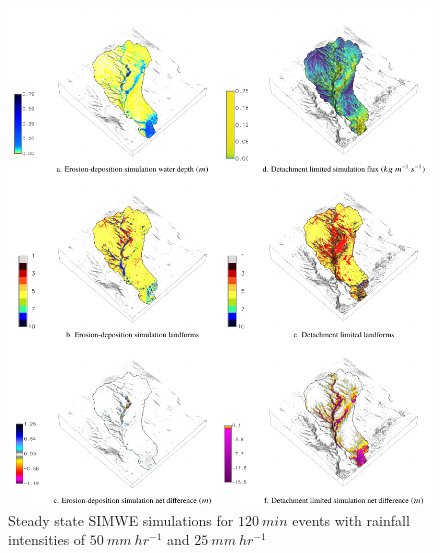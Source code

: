 \documentclass[esurf, manuscript]{copernicus}
\begin{document}
\begin{figure}%
\center
\includegraphics[width=\textwidth,height=0.95\textheight,keepaspectratio]{figures/simwe.pdf}
\caption{Steady state SIMWE simulations
for $120~min$ events with rainfall intensities of $50~mm~hr^{-1}$
and $25~mm~hr^{-1}$}
\label{fig:simwe_simulations}
\end{figure}

\conclusions
\end{document}

